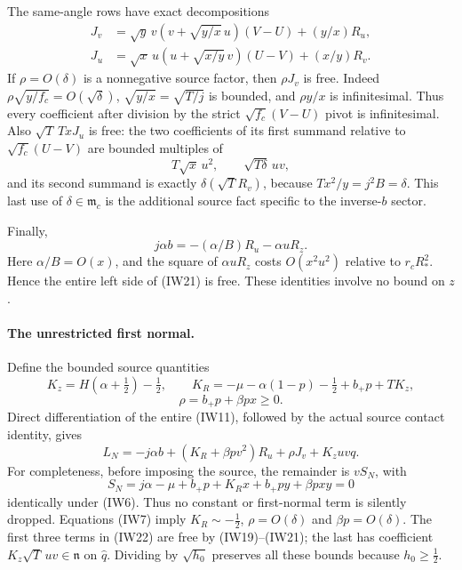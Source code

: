 The same-angle rows have exact decompositions
\[
\begin{split}
 J_v&=\sqrt y\,v(v+\sqrt{y/x}\,u)(V-U)+(y/x)R_u,\\
 J_u&=\sqrt x\,u(u+\sqrt{x/y}\,v)(U-V)+(x/y)R_v.
\end{split}                                                     \tag{IW20}
\]
If $\rho=O(\delta)$ is a nonnegative source factor, then
$\rho J_v$ is free. Indeed $\rho\sqrt{y/f_c}=O(\sqrt\delta)$,
$\sqrt{y/x}=\sqrt{T/j}$ is bounded, and
$\rho y/x$ is infinitesimal. Thus every coefficient after division
by the strict $\sqrt{f_c}(V-U)$ pivot is infinitesimal.
Also $\sqrt T\,TxJ_u$ is free: the two coefficients of its
first summand relative to $\sqrt{f_c}(U-V)$ are bounded multiples of
\[
                  T\sqrt x\,u^2,\qquad\sqrt{T\delta}\,uv,
\]
and its second summand is exactly
$\delta(\sqrt T R_v)$, because $Tx^2/y=j^2B=\delta$.
This last use of $\delta\in\mathfrak m_c$ is the additional
source fact specific to the inverse-$b$ sector.

Finally,
\[
 j\alpha b=-(\alpha/B)R_u-\alpha uR_z.                \tag{IW21}
\]
Here $\alpha/B=O(x)$, and the square of $\alpha uR_z$ costs
$O(x^2u^2)$ relative to $r_cR_*^2$. Hence the entire left side
of (IW21) is free. These identities involve no bound on $z$.

\paragraph{The unrestricted first normal.}
Define the bounded source quantities
\[
 K_z=H(\alpha+\tfrac12)-\tfrac12,\qquad
 K_R=-\mu-\alpha(1-p)-\tfrac12+b_+p+TK_z,
\]
\[
 \rho=b_+p+\beta px\geq0.
\]
Direct differentiation of the entire (IW11), followed by the actual
source contact identity, gives
\[
 L_N=-j\alpha b+(K_R+\beta pv^2)R_u
                   +\rho J_v+K_zuvq.                 \tag{IW22}
\]
For completeness, before imposing the source, the remainder is
$v S_N$, with
\[
 S_N=j\alpha-\mu+b_+p+K_Rx+b_+py+\beta pxy=0
\]
identically under (IW6). Thus no constant or first-normal term is
silently dropped. Equations (IW7) imply
$K_R\sim-\tfrac12$, $\rho=O(\delta)$ and
$\beta p=O(\delta)$. The first three terms in (IW22) are free by
(IW19)--(IW21); the last has coefficient
$K_z\sqrt T\,uv\in\mathfrak n$ on $\widehat q$.
Dividing by $\sqrt{h_0}$ preserves all these bounds because
$h_0\geq\tfrac12$.


